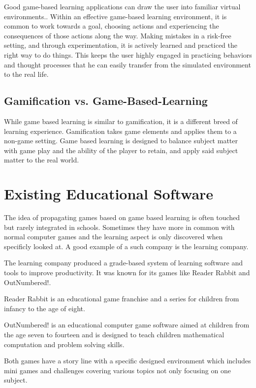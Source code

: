 Good game-based learning applications can draw the user into familiar virtual environments..
Within an effective game-based learning environment, it is common to work towards a goal,
choosing actions and experiencing the consequences of those actions along the way.
Making mistakes in a risk-free setting, and through experimentation,
it is actively learned and practiced the right way to do things.
This keeps the user highly engaged in practicing behaviors and thought processes that he can easily transfer from the
simulated environment to the real life\cite{gal}.

\subsection{Gamification vs. Game-Based-Learning}\label{subsec:gamification-vs.-game-based-learning}
While game based learning is similar to gamification, it is a different breed of learning experience.
Gamification takes game elements and applies them to a non-game setting.
Game based learning is designed to balance subject matter with game play and the ability of the player to retain,
and apply said subject matter to the real world.

\section{Existing Educational Software}\label{sec:existing-educational-software}
The idea of propagating games based on game based learning is often touched but rarely integrated in schools.
Sometimes they have more in common with normal computer games and the learning aspect is only discovered when specificly looked at.
A good example of a such company is the learning company\cite{tlc}.

The learning company produced a grade-based system of learning software and tools to improve productivity.
It was known for its games like Reader Rabbit\cite{readerrabbit} and OutNumbered!\cite{outnumbered}.

Reader Rabbit is an educational game franchise and a series for children from infancy to the age of eight.

OutNumbered! is an educational computer game software aimed at children from the age seven to fourteen and
is designed to teach children mathematical computation and problem solving skills.

Both games have a story line with a specific designed environment which includes mini games and challenges covering
various topics not only focusing on one subject.

